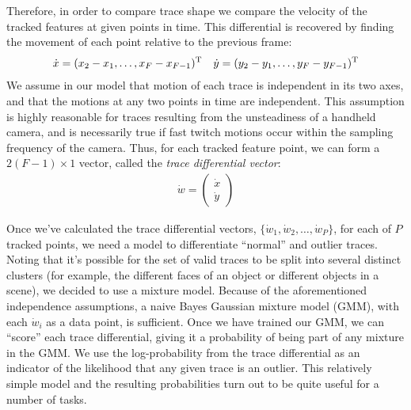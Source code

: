 Therefore, in order to compare trace shape we compare the velocity of the
tracked features at given points in time.
This differential is recovered by finding the movement of each point relative
to the previous frame:
\begin{align*}
\dot x = (x_2-x_1, \ldots, x_F-x_{F-1})^{\rm T} && \dot y = (y_2-y_1, \ldots, y_F-y_{F-1})^{\rm T}
\end{align*}
We assume in our model that motion of each trace is independent in its two
axes, and that the motions at any two points in time are independent.  This
assumption is highly reasonable for traces resulting from the unsteadiness of a
handheld camera, and is necessarily true if fast twitch motions occur within
the sampling frequency of the camera.  Thus, for each tracked feature point, we
can form a $2(F-1)\times 1$ vector, called the {\it trace differential vector}:
\begin{align*}
\dot w = \left( \begin{array}{c}\dot x \\ \dot y\end{array} \right)
\end{align*}

Once we've calculated the trace differential vectors, $\{\dot w_1, \dot w_2,
\ldots , \dot w_P\}$, for each of $P$ tracked points, we need a model to
differentiate ``normal'' and outlier traces.
Noting that it's possible for the set of valid traces to be split into several
distinct clusters (for example, the different faces of an object or different
objects in a scene), we decided to use a mixture model.  Because of the
aforementioned independence assumptions, a naive Bayes Gaussian mixture model
(GMM), with each $\dot{w}_i$ as a data point, is sufficient.  
Once we have trained our GMM, we can ``score'' each trace differential, giving it a
probability of being part of any mixture in the GMM.  We use the
log-probability from the trace differential as an indicator of the likelihood
that any given trace is an outlier.  This relatively simple model and the
resulting probabilities turn out to be quite useful for a number of tasks.



